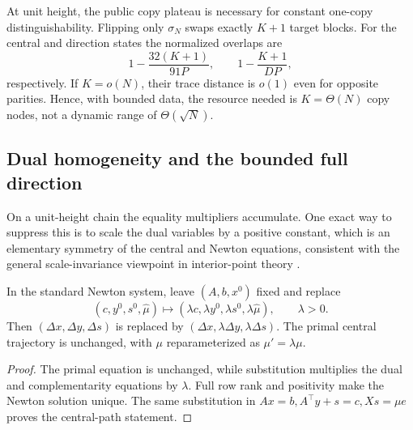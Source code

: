 At unit height, the public copy plateau is necessary for constant
one-copy distinguishability.  Flipping only \(\sigma_N\) swaps exactly \(K+1\) target
blocks.  For the central and direction states the normalized overlaps are
\begin{equation}
 1-\frac{32(K+1)}{91P},\qquad
 1-\frac{K+1}{DP},
\end{equation}
respectively.  If \(K=o(N)\), their trace distance is \(o(1)\) even for
opposite parities.  Hence, with bounded data, the resource needed is
\(K=\Theta(N)\) copy nodes, not a dynamic range of \(\Theta(\sqrt N)\).

\subsection{Dual homogeneity and the bounded full direction}
\label{sec:lp-dual-homogeneity}

On a unit-height chain the equality multipliers accumulate.  One exact way
to suppress this is to scale the dual variables by a positive constant, which is an elementary symmetry of the central and
Newton equations, consistent with the general scale-invariance viewpoint in
interior-point theory \cite{tuncel1998-primal-dual-symmetry-scale-invariance}.

\begin{lemma}
\label{lem:lp-dual-homogeneity}
In the standard Newton system, leave \((A,b,x^0)\) fixed and replace
\begin{equation}
 (c,y^0,s^0,\widehat\mu)
 \longmapsto
 (\lambda c,\lambda y^0,\lambda s^0,\lambda\widehat\mu),
 \qquad\lambda>0.
\end{equation}
Then \((\Delta x,\Delta y,\Delta s)\) is replaced by
\((\Delta x,\lambda\Delta y,\lambda\Delta s)\).  The primal central
trajectory is unchanged, with \(\mu\) reparameterized as
\(\mu'=\lambda\mu\).
\end{lemma}

\begin{proof}
The primal equation is unchanged, while substitution multiplies the dual and
complementarity equations by \(\lambda\).  Full row rank and positivity make
the Newton solution unique.  The same substitution in
\(Ax=b,A^\top y+s=c,Xs=\mu e\) proves the central-path statement.
\end{proof}

